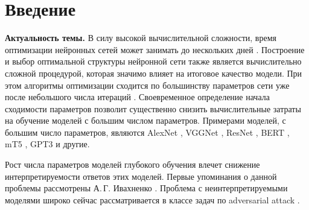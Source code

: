 \newpage{}
\chapter*{Введение}


\textbf{Актуальность темы.} В силу высокой вычислительной сложности, время оптимизации нейронных сетей может занимать до нескольких дней \cite{sutskever2014}.
Построение и выбор оптимальной структуры нейронной сети также является вычислительно сложной процедурой, которая значимо влияет на итоговое качество модели. 
При этом алгоритмы оптимизации сходится по большинству параметров сети уже после небольшого числа итераций \cite{Chunyan2016}.
Своевременное определение начала сходимости параметров позволит существенно снизить вычислительные затраты на обучение моделей с большим числом параметров.
Примерами моделей, с большим число параметров, являются AlexNet \cite{Krizhevsky2012}, VGGNet \cite{Simonyan2014}, ResNet \cite{Kaiming2015}, BERT \cite{Devlin2018, Vaswani2017}, mT5 \cite{Linting2021}, GPT3\cite{Brown2020} и другие.

Рост числа параметров моделей глубокого обучения влечет снижение интерпретируемости ответов этих моделей.
Первые упоминания о данной проблемы рассмотрены А.\,Г. Ивахненко \cite{Ivakhnenko1994}.
Проблема с неинтерпретируемыми моделями широко сейчас рассматривается в классе задач по adversarial attack \cite{Zheng2020}.

